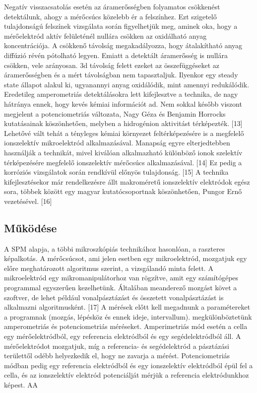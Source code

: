 Negatív visszacsatolás esetén az áramerősségben folyamatos csökkenést detektálunk, ahogy a mérőcsúcs közelebb ér a felszínhez. Ezt szigetelő tulajdonságú felszínek vizsgálata során figyelhetjük meg, aminek oka, hogy a mérőelektród aktív felületénél nullára csökken az oxidálható anyag koncentrációja. A csökkenő távolság megakadályozza, hogy átalakítható anyag diffúzió révén pótolható legyen. Emiatt a detektált áramerősség is nullára csökken, vele arányosan.
 3d távolság felett ezeket az összefüggéseket az áramerősségben és a mért távolságban nem tapasztaljuk. Ilyenkor egy steady state állapot alakul ki, ugyanannyi anyag oxidálódik, mint amennyi redukálódik.
Eredetileg amperometriás detektálásokra lett kifejlesztve a technika, de nagy hátránya ennek, hogy kevés kémiai információt ad. Nem sokkal később viszont megjelent a potenciometriás változata, Nagy Géza és Benjamin Horrocks kutatásainak köszönhetően, melyben a hidrogénion aktivitást térképezték. [13] Lehetővé vált tehát a tényleges kémiai környezet feltérképezésére is a megfelelő ionszelektív mikroelektród alkalmazásával. Manapság egyre elterjedtebben használják a technikát, mivel kiválóan alkalmazható különböző ionok szelektív térképezésére megfelelő ionszelektív mérőcsúcs alkalmazásával. [14] Ez pedig a korróziós vizsgálatok során rendkívül előnyös tulajdonság. [15] A technika kifejlesztésekor már rendelkezésre állt makroméretű ionszelektív elektródok egész sora, többek között egy magyar kutatócsoportnak köszönhetően, Pungor Ernő vezetésével. [16]

\subsection{Működése}

A SPM alapja, a többi mikroszkópiás technikához hasonlóan, a raszteres képalkotás. A mérőcsúcsot, ami jelen esetben egy mikroelektród, mozgatjuk egy előre meghatározott algoritmus szerint, a vizsgálandó minta felett. A mikroelektród egy mikromanipulátorhoz van rögzítve, amit egy számítógépes programmal egyszerűen kezelhetünk. Általában meanderező mozgást követ a szoftver, de lehet például vonalpásztázást és összetett vonalpásztázást is alkalmazni algoritmusként. [17] A mérések előtt kell megadnunk a paramétereket a programnak (mozgás, lépésköz és ennek ideje, intervallum).  megkülönböztetünk amperometriás és potenciometriás méréseket. Amperimetriás mód esetén a cella egy mérőelektródból, egy referencia elektródból és egy segédelektródból áll. A mérőelektródot mozgatjuk, míg a referencia- és segédelektród a pásztázási területtől odébb helyezkedik el, hogy ne zavarja a mérést. Potenciometriás módban pedig egy referencia elektródból és egy ionszelektív elektródból épül fel a cella, és az ionszelektív elektród potenciálját mérjük a referencia elektródunkhoz képest. AA


